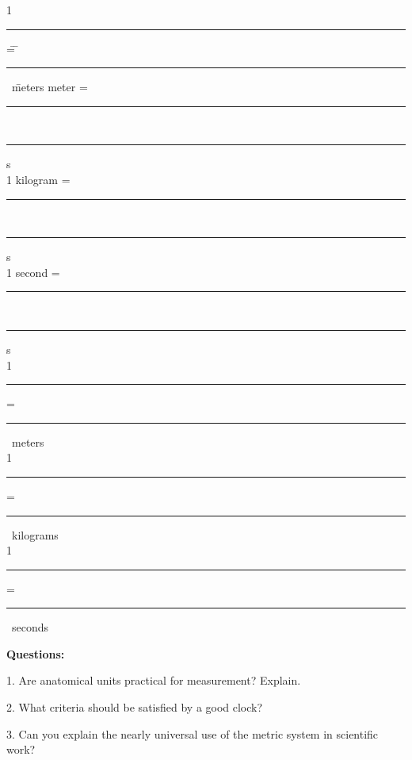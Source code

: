 \begin{enumerate}
\begin{tabbing} 1 \ \rule{1in}{0.2pt} \= = \= \rule{0.25in}{0.2pt} \ \= meters  meter \> = \> \rule{0.25in} {0.2pt} \ \> \rule{1in}{0.2pt}s \\ 1 kilogram \> = \> \rule{0.25in} {0.2pt} \ \> \rule{1in}{0.2pt}s \\ 1 second \> = \> \rule{0.25in} {0.2pt} \ \> \rule{1in}{0.2pt}s \\ 1 \ \rule{1in}{0.2pt} = \rule{0.25in}{0.2pt} \ meters \\ 1 \ \rule{1in}{0.2pt} = \rule{0.25in}{0.2pt} \ kilograms \\ 1 \ \rule{1in}{0.2pt} = \rule{0.25in}{0.2pt} \ seconds \end{tabbing}

\end{enumerate}

\pagebreak

\textbf{Questions: }

1. Are anatomical units practical for measurement? Explain. 
\vspace{20mm}

2. What criteria should be satisfied by a good clock? 
\vspace{20mm}

3. Can you explain the nearly universal use of the metric system in scientific
work?

